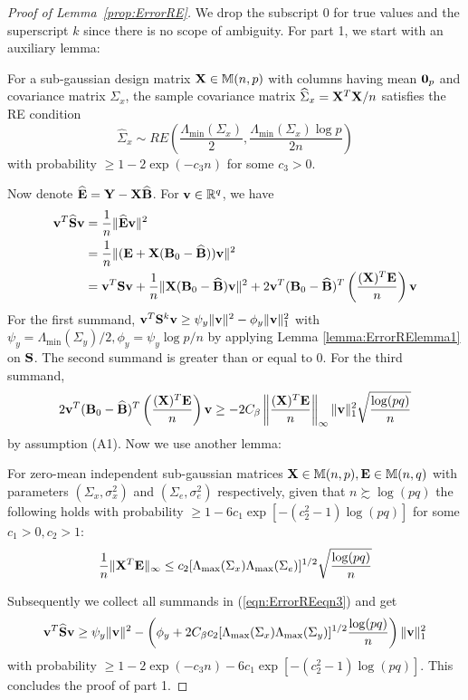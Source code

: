 \begin{proof}[Proof of Lemma~\ref{prop:ErrorRE}]
We drop the subscript 0 for true values and the superscript $k$ since there is no scope of ambiguity. For part 1, we start with an auxiliary lemma:
%
\begin{Lemma}\label{lemma:ErrorRElemma1}
For a sub-gaussian design matrix ${\mathbf{X}} \in {\mathbb{M}}(n,p)$ with columns having mean ${\bf 0}_p$ and covariance matrix $\Sigma_x$, the sample covariance matrix $\widehat \Sigma_x = {\mathbf{X}}^T {\mathbf{X}}/n$ satisfies the RE condition
%
$$
\widehat \Sigma_x \sim RE \left( \frac{\Lambda_{\min} ( \Sigma_x) }{2}, \frac{\Lambda_{\min} ( \Sigma_x) \log p }{2 n} \right)
$$
%
with probability $\geq 1 - 2 \exp(-c_3 n)$ for some $c_3 > 0$.
\end{Lemma}
%
Now denote $\widehat {{\mathbf{E}}} = {\mathbf{Y}} - {\mathbf{X}} \widehat {{\mathbf{B}}}$. For ${\bf{v}} \in {\mathbb{R}}^q$, we have
%
\begin{align}\label{eqn:ErrorREeqn3}
{\bf{v}}^T \widehat {{\mathbf{S}}} {\bf{v}} &= \frac{1}{n} \| \widehat {{\mathbf{E}}} {\bf{v}} \|^2 \notag\\
&= \frac{1}{n} \| ({\mathbf{E}} + {\mathbf{X}} ( {\mathbf{B}}_0 - \widehat {{\mathbf{B}}} )){\bf{v}} \|^2 \notag\\
&= {\bf{v}}^T {\mathbf{S}} {\bf{v}} + \frac{1}{n} \| {\mathbf{X}} ({\mathbf{B}}_0 - \widehat {{\mathbf{B}}}) {\bf{v}} \|^2 + 2 {\bf{v}}^T ({\mathbf{B}}_0 - \widehat {{\mathbf{B}}})^T \left( \frac {({\mathbf{X}})^T {\mathbf{E}}}{n} \right) {\bf{v}}
\end{align}
%
For the first summand, $ {\bf{v}}^T {\mathbf{S}}^k {\bf{v}} \geq \psi_y \| {\bf{v}} \|^2 - \phi_y \| {\bf{v}} \|_1^2$ with $\psi_y = \Lambda_{\min} (\Sigma_y)/2, \phi_y = \psi_y \log p/n$ by applying Lemma \ref{lemma:ErrorRElemma1} on ${\mathbf{S}}$. The second summand is greater than or equal to 0. For the third summand,
%
$$
2 {\bf{v}}^T ({\mathbf{B}}_0 - \widehat {{\mathbf{B}}})^T \left( \frac {({\mathbf{X}})^T {\mathbf{E}}}{n} \right) {\bf{v}} \geq
-2 C_\beta \left\| \frac {({\mathbf{X}})^T {\mathbf{E}}}{n} \right\|_\infty \| {\bf{v}} \|_1^2
\sqrt{ \frac{ \log (pq)}{n}}
$$
%
by assumption (A1). Now we use another lemma:
%
\begin{Lemma}\label{lemma:ErrorRElemma2}
For zero-mean independent sub-gaussian matrices ${\mathbf{X}} \in {\mathbb{M}}(n,p), {\mathbf{E}} \in {\mathbb{M}}(n,q)$ with parameters $(\Sigma_x, \sigma_x^2)$ and $(\Sigma_e, \sigma_e^2)$ respectively, given that $n \succsim \log(pq)$ the following holds with probability $\geq 1 - 6c_1 \exp [-(c_2^2-1) \log(pq)]$ for some $c_1 >0, c_2 > 1$:
%
$$
\frac{1}{n} \| {\mathbf{X}}^T {\mathbf{E}} \|_\infty \leq c_2 [ \Lambda_{\max} (\Sigma_x) \Lambda_{\max} (\Sigma_e) ]^{1/2} \sqrt{\frac{ \log(pq)}{n}}
$$
%
\end{Lemma}
%
Subsequently we collect all summands in (\ref{eqn:ErrorREeqn3}) and get
%
$$
{\bf{v}}^T \widehat{ {\mathbf{S}}} {\bf{v}} \geq \psi_y \| {\bf{v}} \|^2 - \left( \phi_y + 2 C_\beta c_2 [ \Lambda_{\max} (\Sigma_x) \Lambda_{\max} (\Sigma_y) ]^{1/2} \frac{ \log(pq)}{n} \right) \| {\bf{v}} \|_1^2
$$
with probability $\geq 1 - 2\exp(- c_3 n) - 6c_1 \exp [-(c_2^2-1) \log(pq)]$. This concludes the proof of part 1.


\end{proof}
